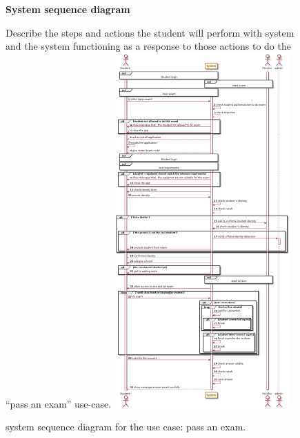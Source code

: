 \documentclass[]{uc2pfecaneva}
\begin{document}
    \begin{figure}
        \raggedright\textbf{System sequence diagram}\linebreak
        \raggedright{Describe the steps and actions the student will perform with system and the system functioning
        as a response to those actions to do the “pass an exam” use-case.}
        \linebreak
        \includegraphics[width=0.6\textwidth]{images/pass_exam}

        \caption{system sequence diagram for the use case: pass an exam.}
    \end{figure}
    \clearpage
\end{document}

